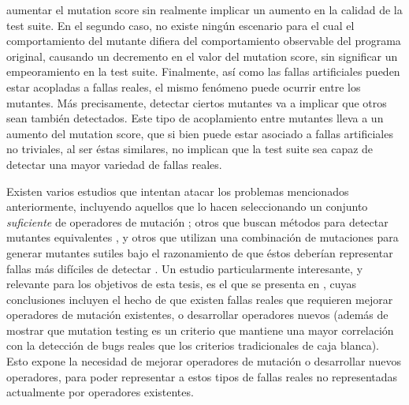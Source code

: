 aumentar el mutation score sin realmente implicar un aumento en la calidad de la test suite. En el segundo caso, no existe ning\'un escenario para el cual el comportamiento del mutante difiera del comportamiento observable del programa original, causando un decremento en el valor del mutation score, sin significar un empeoramiento en la test suite. Finalmente, as\'i como las fallas artificiales pueden estar acopladas a fallas reales, el mismo fen\'omeno puede ocurrir entre los mutantes. M\'as precisamente, detectar ciertos mutantes va a implicar que otros sean tambi\'en detectados. Este tipo de acoplamiento entre mutantes lleva a un aumento del mutation score, que si bien puede estar asociado a fallas artificiales no triviales, al ser \'estas similares, no implican que la test suite sea capaz de detectar una mayor variedad de fallas reales.

Existen varios estudios que intentan atacar los problemas mencionados anteriormente, incluyendo aquellos que lo hacen seleccionando un conjunto \emph{suficiente} de operadores de mutaci\'on \cite{bibliography.mutation.selection.Offutt96, bibliography.mutation.selection.ASN2008}; otros que buscan m\'etodos para detectar mutantes equivalentes \cite{biblography.mutation.evaluation.equivalent.Grun+09, biblography.mutation.evaluation.equivalent.Schuler+10, biblography.mutation.evaluation.equivalent.Just+13}, y otros que utilizan una combinaci\'on de mutaciones para generar mutantes sutiles bajo el razonamiento de que \'estos deber\'ian representar fallas m\'as dif\'iciles de detectar \cite{bibliography.mutation.highorder.Jia+08, bibliography.mutation.highorder.Jia+09, bibliography.mutation.highorder.Harman+11}. Un estudio particularmente interesante, y relevante para los objetivos de esta tesis, es el que se presenta en \cite{bibliography.mutation.evaluation.valid-substitute}, cuyas conclusiones incluyen el hecho de que existen fallas reales que requieren mejorar operadores de mutaci\'on existentes, o desarrollar operadores nuevos (adem\'as de mostrar que mutation testing es un criterio que mantiene una mayor correlaci\'on con la detecci\'on de bugs reales que los criterios tradicionales de caja blanca). Esto expone la necesidad de mejorar operadores de mutaci\'on o desarrollar nuevos operadores, para poder representar a estos tipos de fallas reales no representadas actualmente por operadores existentes.

